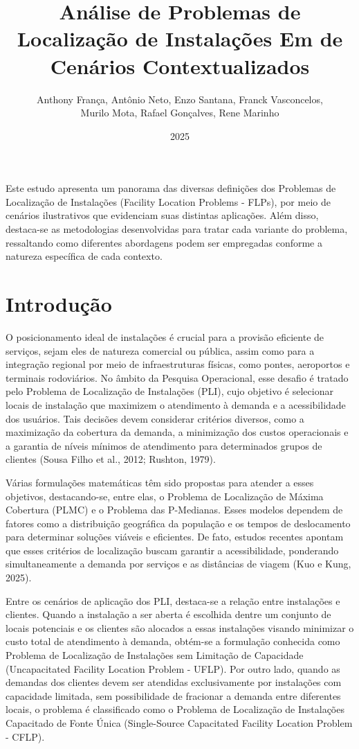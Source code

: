 \documentclass[12pt]{article}
\title{Análise de Problemas de Localização de Instalações Em de Cenários Contextualizados}
\author{Anthony França, Antônio Neto, Enzo Santana, Franck Vasconcelos,\\
Murilo Mota, Rafael Gonçalves, Rene Marinho}
\date{2025}
\begin{document}
 

\maketitle
     
\begin{resumo}
Este estudo apresenta um panorama das diversas definições dos Problemas de Localização de Instalações (Facility Location Problems - FLPs), por meio de cenários ilustrativos que evidenciam suas distintas aplicações. Além disso, destaca-se as metodologias desenvolvidas para tratar cada variante do problema, ressaltando como diferentes abordagens podem ser empregadas conforme a natureza específica de cada contexto.
\end{resumo}

\section{Introdução}

O posicionamento ideal de instalações é crucial para a provisão eficiente de serviços, sejam eles de natureza comercial ou pública, assim como para a integração regional por meio de infraestruturas físicas, como pontes, aeroportos e terminais rodoviários. No âmbito da Pesquisa Operacional, esse desafio é tratado pelo Problema de Localização de Instalações (PLI), cujo objetivo é selecionar locais de instalação que maximizem o atendimento à demanda e a acessibilidade dos usuários. Tais decisões devem considerar critérios diversos, como a maximização da cobertura da demanda, a minimização dos custos operacionais e a garantia de níveis mínimos de atendimento para determinados grupos de clientes (Sousa Filho et al., 2012; Rushton, 1979).

Várias formulações matemáticas têm sido propostas para atender a esses objetivos, destacando-se, entre elas, o Problema de Localização de Máxima Cobertura (PLMC) e o Problema das P-Medianas. Esses modelos dependem de fatores como a distribuição geográfica da população e os tempos de deslocamento para determinar soluções viáveis e eficientes. De fato, estudos recentes apontam que esses critérios de localização buscam garantir a acessibilidade, ponderando simultaneamente a demanda por serviços e as distâncias de viagem (Kuo e Kung, 2025).

Entre os cenários de aplicação dos PLI, destaca-se a relação entre instalações e clientes. Quando a instalação a ser aberta é escolhida dentre um conjunto de locais potenciais e os clientes são alocados a essas instalações visando minimizar o custo total de atendimento à demanda, obtém-se a formulação conhecida como Problema de Localização de Instalações sem Limitação de Capacidade (Uncapacitated Facility Location Problem - UFLP). Por outro lado, quando as demandas dos clientes devem ser atendidas exclusivamente por instalações com capacidade limitada, sem possibilidade de fracionar a demanda entre diferentes locais, o problema é classificado como o Problema de Localização de Instalações Capacitado de Fonte Única (Single-Source Capacitated Facility Location Problem - CFLP).
\end{document}
